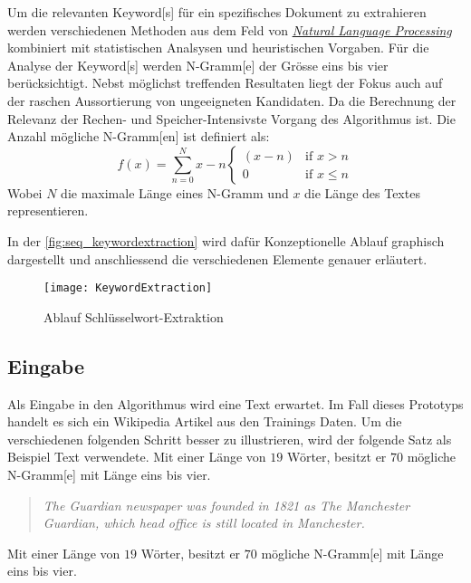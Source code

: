 Um die relevanten \gls{Keyword}[s] für ein spezifisches Dokument zu extrahieren werden verschiedenen Methoden aus dem Feld von \hyperref[natural-language-processing]{\textit{Natural Language Processing}} kombiniert mit statistischen Analsysen und heuristischen Vorgaben. Für die Analyse der \gls{Keyword}[s] werden \gls{N-Gramm}[e] der Grösse eins bis vier berücksichtigt. Nebst möglichst treffenden Resultaten liegt der Fokus auch auf der raschen Aussortierung von ungeeigneten Kandidaten. Da die Berechnung der Relevanz der Rechen- und Speicher-Intensivste Vorgang des Algorithmus ist.  Die Anzahl mögliche \gls{N-Gramm}[en] ist definiert als: 
\[f(x)=\sum_{n=0}^N x - n  
\begin{cases} 
   (x - n)  & \text{if } x > n \\
   0      & \text{if } x \leq n
  \end{cases}\]
Wobei $N$ die maximale Länge eines \gls{N-Gramm} und $x$ die Länge des Textes representieren.

In der \autoref{fig:seq_keywordextraction} wird dafür Konzeptionelle Ablauf graphisch dargestellt und anschliessend die verschiedenen Elemente genauer erläutert.

    \begin{figure}[H]
    \centering
    \texttt{[image: KeywordExtraction]}
    \caption{Ablauf Schlüsselwort-Extraktion}
    \label{fig:seq_keywordextraction}
    \end{figure}
 
 
 

\subsection{Eingabe}


Als Eingabe in den Algorithmus wird eine Text erwartet. Im Fall dieses Prototyps handelt es sich ein Wikipedia Artikel aus den Trainings Daten. Um die verschiedenen folgenden Schritt besser zu illustrieren, wird der folgende Satz als Beispiel Text verwendete. Mit einer Länge von $19$ Wörter, besitzt er $70$ mögliche \gls{N-Gramm}[e] mit Länge eins bis vier.

\begin{quote}
\textit{The Guardian newspaper was founded in 1821 as \glqq The Manchester Guardian\grqq, which head office is still located in Manchester.}
\end{quote}
Mit einer Länge von $19$ Wörter, besitzt er $70$ mögliche \gls{N-Gramm}[e] mit Länge eins bis vier.


